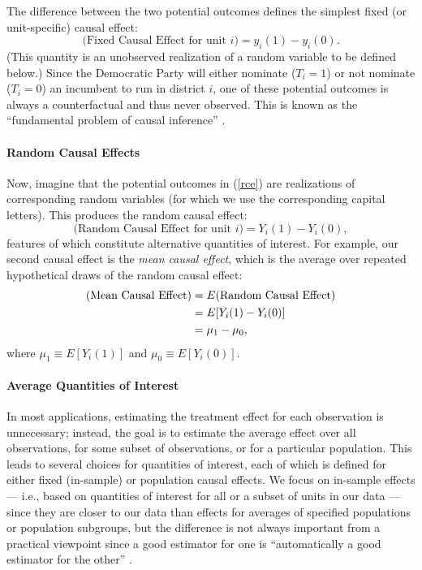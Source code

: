 \documentclass[11pt,titlepage]{article}
\begin{document}
The difference between the two potential outcomes defines the simplest
fixed (or unit-specific) causal effect:
\begin{equation}
  \label{rce}
  \text{(Fixed Causal Effect for unit $i$)} = y_i(1) - y_i(0).
\end{equation}
(This quantity is an unobserved realization of a random variable to be
defined below.)  Since the Democratic Party will either nominate
($T_i=1$) or not nominate ($T_i=0$) an incumbent to run in district
$i$, one of these potential outcomes is always a counterfactual and
thus never observed. This is known as the ``fundamental problem of
causal inference'' \citep{Holland86}.

\paragraph{Random Causal Effects} 
Now, imagine that the potential outcomes in (\ref{rce}) are
realizations of corresponding random variables (for which we use the
corresponding capital letters).  This produces the random causal
effect:
\begin{equation}
  \label{rance}
  \text{(Random Causal Effect for unit $i$)}  = Y_i(1) - Y_i(0),
\end{equation}
features of which constitute alternative quantities of interest.  For
example, our second causal effect is the \emph{mean causal effect},
which is the average over repeated hypothetical draws of the random
causal effect:
\begin{align}
  \label{meance} \text{(Mean Causal Effect)}
  &= E(\text{Random Causal Effect})\\
  &= E[Y_i(1) - Y_i(0)]\\ \notag &= \mu_1 - \mu_0,
\end{align}
where $\mu_1\equiv E[Y_i(1)]$ and $\mu_0\equiv E[Y_i(0)]$.

\paragraph{Average Quantities of Interest}
In most applications, estimating the treatment effect for each
observation is unnecessary; instead, the goal is to estimate the
average effect over all observations, for some subset of observations,
or for a particular population.  This leads to several choices for
quantities of interest, each of which is defined for either fixed
(in-sample) or population causal effects.  We focus on in-sample
effects --- i.e., based on quantities of interest for all or a subset
of units in our data --- since they are closer to our data than
effects for averages of specified populations or population subgroups,
but the difference is not always important from a practical viewpoint
since a good estimator for one is ``automatically a good estimator for
the other'' \citep[p. 6]{Imbens04}.
\end{document}
